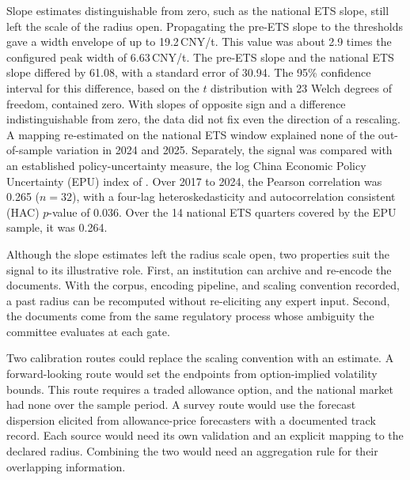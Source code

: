 \documentclass[5p,times,authoryear]{elsarticle}
\theoremstyle{plain}
\begin{document}
Slope estimates distinguishable from zero, such as the national ETS slope, still left the scale of the radius open. Propagating the pre-ETS slope to the thresholds gave a width envelope of up to 19.2\,CNY/t. This value was about 2.9 times the configured peak width of 6.63\,CNY/t. The pre-ETS slope and the national ETS slope differed by 61.08, with a standard error of 30.94. The 95\% confidence interval for this difference, based on the $t$ distribution with 23 Welch degrees of freedom, contained zero. With slopes of opposite sign and a difference indistinguishable from zero, the data did not fix even the direction of a rescaling. A mapping re-estimated on the national ETS window explained none of the out-of-sample variation in 2024 and 2025. Separately, the signal was compared with an established policy-uncertainty measure, the log China Economic Policy Uncertainty (EPU) index of \citet{Baker2016}. Over 2017 to 2024, the Pearson correlation was 0.265 ($n=32$), with a four-lag heteroskedasticity and autocorrelation consistent (HAC) $p$-value of 0.036. Over the 14 national ETS quarters covered by the EPU sample, it was 0.264.

Although the slope estimates left the radius scale open, two properties suit the signal to its illustrative role. First, an institution can archive and re-encode the documents. With the corpus, encoding pipeline, and scaling convention recorded, a past radius can be recomputed without re-eliciting any expert input. Second, the documents come from the same regulatory process whose ambiguity the committee evaluates at each gate.

Two calibration routes could replace the scaling convention with an estimate. A forward-looking route would set the endpoints from option-implied volatility bounds. This route requires a traded allowance option, and the national market had none over the sample period. A survey route would use the forecast dispersion elicited from allowance-price forecasters with a documented track record. Each source would need its own validation and an explicit mapping to the declared radius. Combining the two would need an aggregation rule for their overlapping information.
\end{document}
